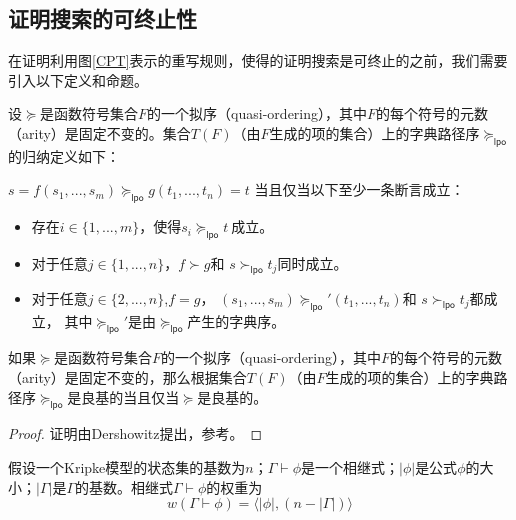 \subsection{证明搜索的可终止性}
在证明利用图\ref{CPT}表示的重写规则，使得\sctlprov{}的证明搜索是可终止的之前，我们需要引入以下定义和命题。

\begin{definition}
	设$\succeq$是函数符号集合$F$的一个拟序（quasi-ordering），其中$F$的每个符号的元数（arity）是固定不变的。集合$T(F)$（由$F$生成的项的集合）上的字典路径序$\succeq_{\mathsf{lpo}}$的归纳定义如下：
	
	$s=f(s_1,...,s_m)\succeq_{\mathsf{lpo}}g(t_1,...,t_n)=t$ 
	当且仅当以下至少一条断言成立：
	\begin{itemize}
		\item 存在$i\in\{1,...,m\}$，使得$s_i\succeq_{\mathsf{lpo}} t~$成立。
		\item 对于任意$j\in\{1,...,n\}$，$f\succ g$和 $s\succ_{\mathsf{lpo}} t_j$同时成立。
		\item 对于任意$j\in\{2,...,n\}$,$f=g$， $(s_1,...,s_m)\succeq_{\mathsf{lpo}}'(t_1,..., t_n)$和 $s\succ_{\mathsf{lpo}}t_j$都成立，
		其中$\succeq_{\mathsf{lpo}}'$是由$\succeq_{\mathsf{lpo}}$产生的字典序。
	\end{itemize}
\end{definition}

\begin{proposition}
	[字典路径序的良基性]\label{termination:well-foundness}
	如果$\succeq$是函数符号集合$F$的一个拟序（quasi-ordering），其中$F$的每个符号的元数（arity）是固定不变的，那么根据集合$T(F)$（由$F$生成的项的集合）上的字典路径序$\succeq_{\mathsf{lpo}}$是良基的当且仅当$\succeq$是良基的。
\end{proposition}
\begin{proof}
	证明由Dershowitz提出，参考\cite{Dershowitz87}。
\end{proof}

\begin{definition}[相继式的权重]\label{sequent:weight}
	假设一个Kripke模型的状态集的基数为$n$；$\Gamma\vdash\phi$是一个\sctlm{}相继式；$|\phi|$是公式$\phi$的大小；$|\Gamma|$是$\Gamma$的基数。相继式$\Gamma\vdash\phi$的权重为$$w(\Gamma\vdash \phi) = \langle|\phi|, (n - |\Gamma|)\rangle$$
\end{definition}

